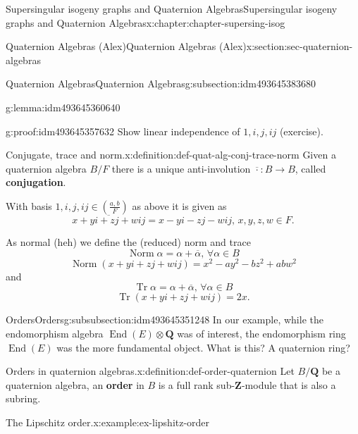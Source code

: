 \documentclass[oneside,10pt,]{book}
\newcommand{\terminology}[1]{\textbf{#1}}
\numberwithin{equation}{section}
\newcommand{\legendre}[2]{\left(\frac{#1}{#2}\right)}
\newcommand{\ZZ}{\mathbf{Z}}
\newcommand{\QQ}{\mathbf{Q}}
\DeclareMathOperator{\End}{End}
\DeclareMathOperator{\norm}{Norm}
\DeclareMathOperator{\trace}{Tr}
\begin{document}
\begin{chapterptx}{Supersingular isogeny graphs and Quaternion Algebras}{}{Supersingular isogeny graphs and Quaternion Algebras}{}{}{x:chapter:chapter-supersing-isog}
\begin{sectionptx}{Quaternion Algebras (Alex)}{}{Quaternion Algebras (Alex)}{}{}{x:section:sec-quaternion-algebras}
\begin{subsectionptx}{Quaternion Algebras}{}{Quaternion Algebras}{}{}{g:subsection:idm493645383680}
\begin{introduction}{}
\begin{lemma}{}{}{g:lemma:idm493645360640}
\end{lemma}
\begin{proofptx}{}{g:proof:idm493645357632}
Show linear independence of \(1,i,j,ij\) (exercise).%
\end{proofptx}
\begin{definition}{Conjugate, trace and norm.}{x:definition:def-quat-alg-conj-trace-norm}%
Given a quaternion algebra \(B/F\) there is a unique anti-involution \(\overline \cdot \colon B \to B\), called \terminology{conjugation}.%
\par
With basis \(1,i,j,ij\in \legendre{a,b}{F}\) as above it is given as%
\begin{equation*}
\overline {x + yi + zj + w ij} = x - yi - zj - w ij,\,x,y,z,w\in F\text{.}
\end{equation*}
%
\par
As normal (heh) we define the (reduced) norm and trace%
\begin{equation*}
\norm \alpha =  \alpha + \overline \alpha,\,\forall \alpha \in B
\end{equation*}
%
\begin{equation*}
\norm(x + yi + zj + w ij) = x^2 - ay^2 - b z^2 + ab w^2
\end{equation*}
and%
\begin{equation*}
\trace \alpha =  \alpha + \overline \alpha,\,\forall \alpha \in B
\end{equation*}
%
\begin{equation*}
\trace (x + yi + zj + w ij) = 2x\text{.}
\end{equation*}
%
\end{definition}
\end{introduction}%
%
%
\typeout{************************************************}
\typeout{************************************************}
%
\begin{subsubsectionptx}{Orders}{}{Orders}{}{}{g:subsubsection:idm493645351248}
In our example, while the endomorphism algebra \(\End(E)\otimes \QQ\) was of interest, the endomorphism ring \(\End(E)\) was the more fundamental object. What is this? A quaternion ring?%
\begin{definition}{Orders in quaternion algebras.}{x:definition:def-order-quaternion}%
Let \(B/\QQ\) be a quaternion algebra, an \terminology{order} in \(B\) is a full rank sub-\(\ZZ\)-module that is also a subring.%
\end{definition}
\begin{example}{The Lipschitz order.}{x:example:ex-lipshitz-order}%

\end{example}
\end{subsubsectionptx}
\end{subsectionptx}
\end{sectionptx}
\end{chapterptx}
\end{document}
